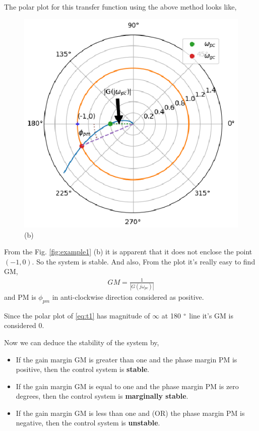 \begin{enumerate}[label=\thesection.\arabic*.,ref=\thesection.\theenumi]
The polar plot for this transfer function using the above method looks like,
\begin{figure}[!h]
    \includegraphics[width=\columnwidth]{./figs/ee18btech11028/example.eps}
  \caption{(b)}
  \label{fig:examplefig}
\end{figure}


From the Fig. \ref{fig:example1} (b) it is apparent that it does not enclose the point $(-1,0)$.
So the system is stable.
And also,
From the plot it's really easy to find GM,
\begin{align}
    GM = \frac{1}{|G(j\omega_{pc})|}
\end{align}
and PM is $\phi_{pm}$ in anti-clockwise direction considered as positive.

Since the polar plot of \eqref{eq:t1} has magnitude of $\infty$ at 180 $\degree$ line it's GM is considered 0.

Now we can deduce the stability of the system by,
\begin{itemize}
    \item If the gain margin GM is greater than one and the phase margin PM is positive, then the control system is \textbf{stable}.
    \item If the gain margin GM is equal to one and the phase margin PM is zero degrees, then the control system is  \textbf{marginally stable}.
    \item If the gain margin GM is less than one and (OR) the phase margin PM is negative, then the control system is \textbf{unstable}.
\end{itemize}



\end{enumerate}
